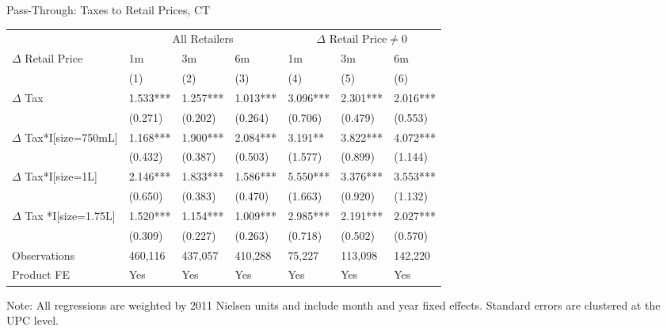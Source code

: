\documentclass[aspectratio=169]{beamer}
\begin{document}
\begin{frame}{Pass-Through:  Taxes to Retail Prices, CT}
\tiny
\begin{table}[htp]
\begin{center}
\begin{tabular}{l l l l l l l } \hline
& \multicolumn{3}{c}{All Retailers} & \multicolumn{3}{c}{$\Delta$ Retail Price$ \neq 0$} \\ 
 $\Delta$ Retail Price & 1m & 3m & 6m & 1m & 3m & 6m \\   
 & (1) & (2) & (3) & (4) & (5) & (6)  \\  
\hline
$\Delta$ Tax & 1.533*** & 1.257*** & 1.013*** & 3.096*** & 2.301*** & 2.016*** \\
& (0.271) & (0.202) & (0.264) & (0.706) & (0.479) & (0.553) \\ \hline
$\Delta$ Tax*I[size=750mL] & 1.168*** & 1.900*** & 2.084*** & 3.191** & 3.822*** & 4.072*** \\
& (0.432) & (0.387) & (0.503) & (1.577) & (0.899) & (1.144) \\
$\Delta$ Tax*I[size=1L] & 2.146*** & 1.833*** & 1.586*** & 5.550*** & 3.376*** & 3.553*** \\
& (0.650) & (0.383) & (0.470) & (1.663) & (0.920) & (1.132) \\
$\Delta$ Tax *I[size=1.75L]  & 1.520*** & 1.154*** & 1.009*** & 2.985*** & 2.191*** & 2.027*** \\
& (0.309) & (0.227) & (0.263) & (0.718) & (0.502) & (0.570) \\ \hline
Observations & 460,116 & 437,057 & 410,288 & 75,227 & 113,098 & 142,220\\
Product FE & Yes & Yes & Yes & Yes & Yes & Yes \\  \hline
\end{tabular}
\end{center}
\begin{tablenotes}
\footnotesize \item \tiny Note: All regressions are weighted by 2011 Nielsen units and include month and year fixed effects. Standard errors are clustered at the UPC level.
\end{tablenotes}
\end{table}
\end{frame}
\end{document}
